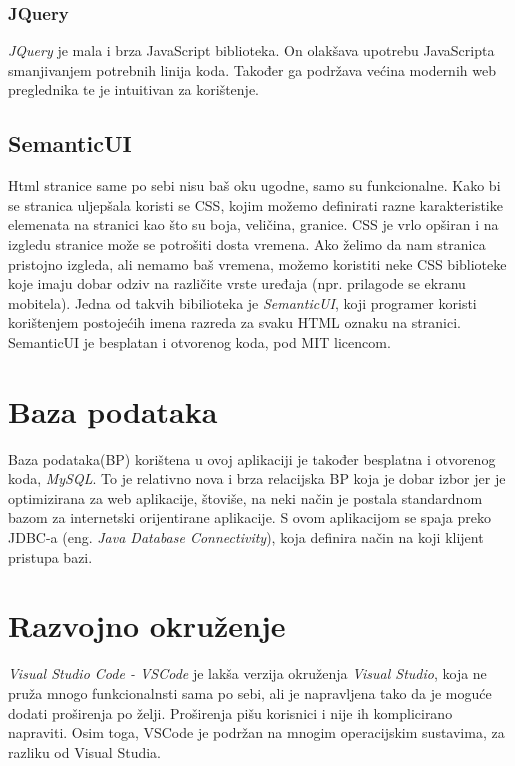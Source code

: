 \documentclass[zavrsni, numeric]{fer}
\begin{document}
\subsubsection{JQuery}
\textit{JQuery}\citep{jquery} je mala i brza JavaScript biblioteka. On olakšava upotrebu JavaScripta smanjivanjem potrebnih linija koda. Također ga podržava većina modernih web preglednika te je intuitivan za korištenje.

\subsection{SemanticUI}
Html stranice same po sebi nisu baš oku ugodne, samo su funkcionalne. Kako bi se stranica uljepšala koristi se CSS, kojim možemo definirati razne karakteristike elemenata na stranici kao što su boja, veličina, granice. CSS je vrlo opširan i na izgledu stranice može se potrošiti dosta vremena. Ako želimo da nam stranica pristojno izgleda, ali nemamo baš vremena, možemo koristiti neke CSS biblioteke koje imaju dobar odziv na različite vrste uređaja (npr. prilagode se ekranu mobitela). Jedna od takvih bibilioteka je \textit{SemanticUI}\citep{semantic}, koji programer koristi korištenjem postojećih imena razreda za svaku HTML oznaku na stranici. SemanticUI je besplatan i otvorenog koda, pod MIT licencom.

\section{Baza podataka}
Baza podataka(BP) korištena u ovoj aplikaciji je također besplatna i otvorenog koda, \textit{MySQL}\citep{mysql}. To je relativno nova i brza relacijska BP koja je dobar izbor jer je optimizirana za web aplikacije, štoviše, na neki način je postala standardnom bazom za internetski orijentirane aplikacije. S ovom aplikacijom se spaja preko JDBC-a (eng. \textit{Java Database Connectivity}), koja definira način na koji klijent pristupa bazi.

\section{Razvojno okruženje}
\textit{Visual Studio Code - VSCode}\citep{vscode} je lakša verzija okruženja \textit{Visual Studio}, koja ne pruža mnogo funkcionalnsti sama po sebi, ali je napravljena tako da je moguće dodati proširenja po želji. Proširenja pišu korisnici i nije ih komplicirano napraviti. Osim toga, VSCode je podržan na mnogim operacijskim sustavima, za razliku od Visual Studia.
\end{document}
